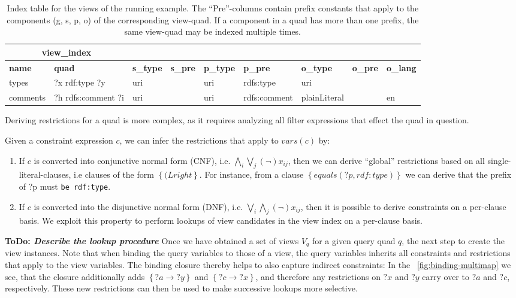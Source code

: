 \documentclass[a4paper,twoside,bibtotoc,abstracton,12pt,BCOR=15mm]{scrreprt}
\newcommand{\todo}[1]{\textbf{ToDo: \textit{#1}}}
\begin{document}
\begin{table}
\begin{scriptsize}
\begin{tabular}{|lllllllll|} \cline{1-2}
\multicolumn{2}{|c|}{view\_index} \\ \hline
\textbf{name} & \textbf{quad} & \textbf{s\_type} & \textbf{s\_pre} & \textbf{p\_type} & \textbf{p\_pre} & \textbf{o\_type} & \textbf{o\_pre} & \textbf{o\_lang} \\ \hline
types & ?x rdf:type ?y & uri & & uri & rdfs:type & uri & & \\
comments & ?h rdfs:comment ?i & uri & & uri & rdfs:comment & plainLiteral & & en \\
\bottomrule
\end{tabular}
\end{scriptsize}
\caption{Index table for the views of the running example. The ``Pre''-columns contain prefix constants that apply to the components (g, s, p, o) of the corresponding view-quad.
If a component in a quad has more than one prefix, the same view-quad may be indexed multiple times.}
\label{tab:view-index}
\end{table}


Deriving restrictions for a quad is more complex, as it requires analyzing all filter expressions that effect the quad in question.

Given a constraint expression $c$, we can infer the restrictions that apply to $vars(c)$ by:
\begin{enumerate}
  \item If $c$ is converted into conjunctive normal form (CNF), i.e. $\bigwedge_{i} \bigvee_{j} (\lnot) x_{ij}$,
  then we can derive ``global'' restrictions based on all single-literal-clauses, i.e clauses of the form $\left \{ (L right \right \}$.
  For instance, from a clause $\left \{ equals \left ( ?p, rdf:type \right ) \right \}$ we can derive that the prefix of ?p must \texttt{be rdf:type}.
  \item If $c$ is converted into the disjunctive normal form (DNF), i.e. $\bigvee_{i} \bigwedge_{j} (\lnot) x_{ij}$, then it is possible to derive
  constraints on a per-clause basis. We exploit this property to perform lookups of view candidates in the view index on a per-clause basis. 
\end{enumerate}


\todo{Describe the lookup procedure}
Once we have obtained a set of views $V_q$ for a given query quad $q$, the next step to create the view instances.
Note that when binding the query variables to those of a view, the query variables inherits all constraints and restrictions that apply to the view variables.
The binding closure thereby helps to also capture indirect constraints: In the ~\autoref{fig:binding-multimap} we see, that the closure additionally
adds $\left \{?a \rightarrow ?y \right \}$ and $\left \{?c \rightarrow ?x \right \}$, and therefore any restrictions on
$?x$ and $?y$ carry over to $?a$ and $?c$, respectively.
These new restrictions can then be used to make successive lookups more selective.
\end{document}
